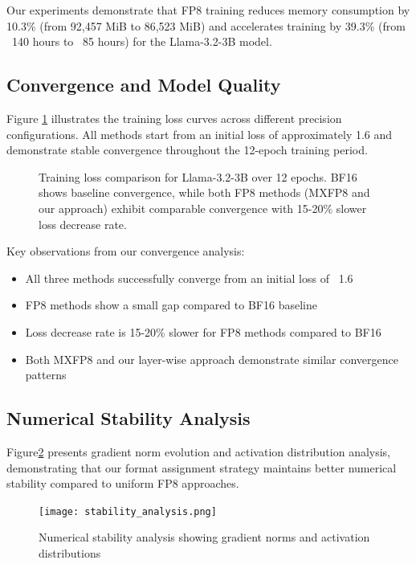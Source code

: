 \documentclass[conference]{IEEEtran}
\begin{document}
Our experiments demonstrate that FP8 training reduces memory consumption by 10.3\% (from 92,457 MiB to 86,523 MiB) and accelerates training by 39.3\% (from ~140 hours to ~85 hours) for the Llama-3.2-3B model.

\subsection{Convergence and Model Quality}

Figure \ref{fig:convergence_analysis} illustrates the training loss curves across different precision configurations. All methods start from an initial loss of approximately 1.6 and demonstrate stable convergence throughout the 12-epoch training period.

\begin{figure}[htbp]
    \centering
    \caption{Training loss comparison for Llama-3.2-3B over 12 epochs. BF16 shows baseline convergence, while both FP8 methods (MXFP8 and our approach) exhibit comparable convergence with 15-20\% slower loss decrease rate.}
    \label{fig:convergence_analysis}
\end{figure}

Key observations from our convergence analysis:
\begin{itemize}
\item All three methods successfully converge from an initial loss of ~1.6
\item FP8 methods show a small gap compared to BF16 baseline
\item Loss decrease rate is 15-20\% slower for FP8 methods compared to BF16
\item Both MXFP8 and our layer-wise approach demonstrate similar convergence patterns
\end{itemize}

\subsection{Numerical Stability Analysis}

Figure\ref{fig:stability_analysis} presents gradient norm evolution and activation distribution analysis, demonstrating that our format assignment strategy maintains better numerical stability compared to uniform FP8 approaches.

\begin{figure}[htbp]
    \centering
    \texttt{[image: stability\_analysis.png]}
    \caption{Numerical stability analysis showing gradient norms and activation distributions}
    \label{fig:stability_analysis}
\end{figure}
\end{document}
